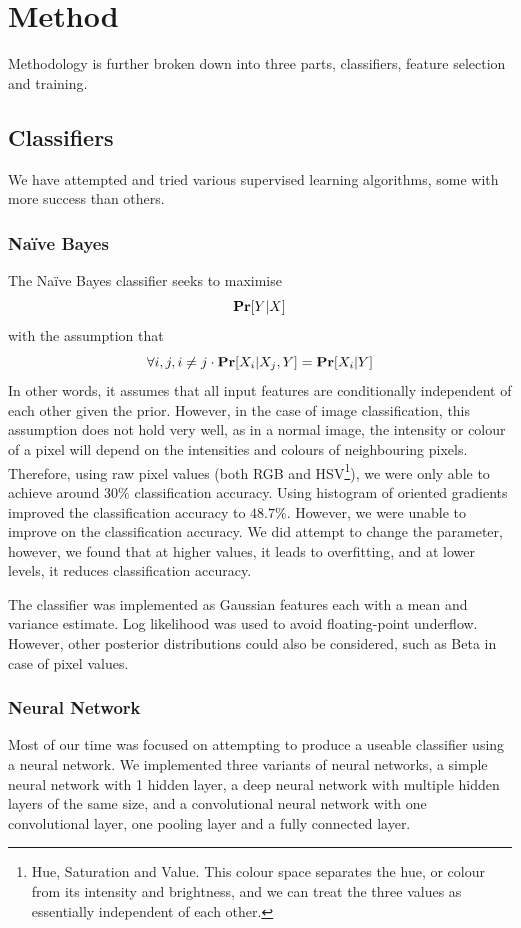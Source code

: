 \documentclass{article} %
\begin{document}
\section{Method}
Methodology is further broken down into three parts, classifiers, feature selection and training.




\subsection{Classifiers}
We have attempted and tried various supervised learning algorithms, some with more success than others.

\subsubsection{Na\"ive Bayes}
The Na\"ive Bayes classifier seeks to maximise
$$\mathbf{Pr}[{Y|X}]$$
with the assumption that
$$\forall i,j,  i\neq j \cdot \mathbf{Pr}[{X_i|X_j, Y}]=\mathbf{Pr}[{X_i|Y}]$$
In other words, it assumes that all input features are conditionally independent of each other given the prior. However, in the case of image classification, this assumption does
not hold very well, as in a normal image, the intensity or colour of a pixel will depend on the intensities and colours of neighbouring pixels. Therefore, using raw pixel values (both 
RGB and HSV\footnote{Hue, Saturation and Value. This colour space separates the hue, or colour from its intensity and brightness, and we can treat the three values as essentially independent of each other.}), we were only able to achieve around $30\%$ classification accuracy. Using histogram of oriented gradients improved the classification accuracy to $48.7\%$. However, we
were unable to improve on the classification accuracy. We did attempt to change the  parameter, however, we found that at higher values, it leads to overfitting, and
at lower levels, it reduces classification accuracy.

The classifier was implemented as Gaussian features each with a mean and variance estimate. Log likelihood was used to avoid floating-point underflow. However, other posterior distributions could also be considered, such as Beta in case of pixel values.

\subsubsection{Neural Network}
Most of our time was focused on attempting to produce a useable classifier using a neural network. We implemented three variants of neural networks, a simple neural network with 1 hidden layer, a deep neural network with multiple hidden layers of the same size, and a convolutional neural network with one convolutional layer, one pooling layer and a fully connected layer.
\end{document}
